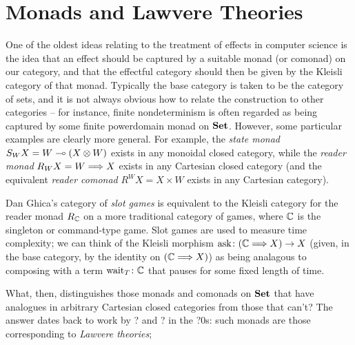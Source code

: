 \documentclass{article}
\begin{document}
\section{Monads and Lawvere Theories}

One of the oldest ideas relating to the treatment of effects in computer science is the idea that an effect should be captured by a suitable monad (or comonad) on our category, and that the effectful category should then be given by the Kleisli category of that monad.  
Typically the base category is taken to be the category of sets, and it is not always obvious how to relate the construction to other categories -- for instance, finite nondeterminism is often regarded as being captured by some finite powerdomain monad on ${\normalfont\textbf{Set}}$.  
However, some particular examples are clearly more general.  
For example, the \emph{state monad} $S_W X = W \multimap (X \otimes W)$ exists in any monoidal closed category, while the \emph{reader monad} $R_W X = W \Longrightarrow X$ exists in any Cartesian closed category (and the equivalent \emph{reader comonad} $R^W X = X \times W$ exists in any Cartesian category).  

\begin{example}
  Dan Ghica's category of \emph{slot games} is equivalent to the Kleisli category for the reader monad $R_{\mathbb{C}}$ on a more traditional category of games, where $\mathbb{C}$ is the singleton or command-type game.  
  Slot games are used to measure time complexity; we can think of the Kleisli morphism $\text{ask}\colon (\mathbb{C} \Longrightarrow X) \to X$ (given, in the base category, by the identity on $(\mathbb{C} \Longrightarrow X)$) as being analagous to composing with a term $\text{wait}_T\colon \mathbb{C}$ that pauses for some fixed length of time.
\end{example}

What, then, distinguishes those monads and comonads on ${\normalfont\textbf{Set}}$ that have analogues in arbitrary Cartesian closed categories from those that can't? 
The answer dates back to work by ? and ? in the ?0s: such monads are those corresponding to \emph{Lawvere theories}; 
\end{document}

